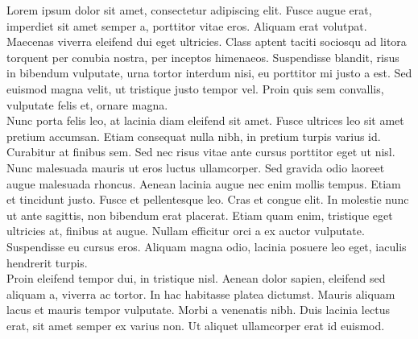 Lorem ipsum dolor sit amet, consectetur adipiscing elit. Fusce augue erat, imperdiet sit amet semper a, porttitor vitae eros. Aliquam erat volutpat. Maecenas viverra eleifend dui eget ultricies. Class aptent taciti sociosqu ad litora torquent per conubia nostra, per inceptos himenaeos. Suspendisse blandit, risus in bibendum vulputate, urna tortor interdum nisi, eu porttitor mi justo a est. Sed euismod magna velit, ut tristique justo tempor vel. Proin quis sem convallis, vulputate felis et, ornare magna.\\
Nunc porta felis leo, at lacinia diam eleifend sit amet. Fusce ultrices leo sit amet pretium accumsan. Etiam consequat nulla nibh, in pretium turpis varius id. Curabitur at finibus sem. Sed nec risus vitae ante cursus porttitor eget ut nisl. Nunc malesuada mauris ut eros luctus ullamcorper. Sed gravida odio laoreet augue malesuada rhoncus. Aenean lacinia augue nec enim mollis tempus. Etiam et tincidunt justo. Fusce et pellentesque leo. Cras et congue elit. In molestie nunc ut ante sagittis, non bibendum erat placerat. Etiam quam enim, tristique eget ultricies at, finibus at augue. Nullam efficitur orci a ex auctor vulputate. Suspendisse eu cursus eros. Aliquam magna odio, lacinia posuere leo eget, iaculis hendrerit turpis.\\
Proin eleifend tempor dui, in tristique nisl. Aenean dolor sapien, eleifend sed aliquam a, viverra ac tortor. In hac habitasse platea dictumst. Mauris aliquam lacus et mauris tempor vulputate. Morbi a venenatis nibh. Duis lacinia lectus erat, sit amet semper ex varius non. Ut aliquet ullamcorper erat id euismod.\\

